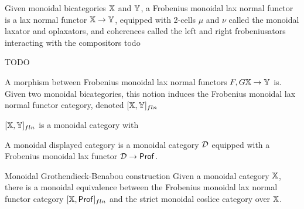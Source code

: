 \begin{definition}
Given monoidal bicategories $\mathbb{X}$ and $\mathbb{Y}$, a  Frobenius monoidal lax normal functor is a lax normal functor $\mathbb{X}\to\mathbb{Y}$, equipped with 2-cells $\mu$ and $\nu$ called the monoidal laxator and oplaxators, and coherences called the left and right frobeniusators interacting with the compositors todo 

TODO
\end{definition}



\begin{definition}
A morphism between Frobenius monoidal lax normal functors $F,G\mathbb{X}\to\mathbb{Y}$ is.  Given two monoidal bicategories, this notion induces the Frobenius monoidal lax normal functor category, denoted $[\mathbb{X},\mathbb{Y}]_{fln}$
\end{definition}

\begin{lemma}
$[\mathbb{X},\mathbb{Y}]_{fln}$ is a monoidal category with
\end{lemma}



\begin{definition}
A monoidal displayed category is a monoidal category $\mathcal{D}$ equipped with a  Frobenius monoidal lax functor $\mathcal{D}\to{\sf Prof}$.
\end{definition}

\begin{theorem}{Monoidal Grothendieck-Benabou construction}
Given a monoidal category $\mathbb{X}$, there is a monoidal equivalence between the Frobenius monoidal lax normal functor category $[\mathbb{X},{\sf Prof}]_{fln}$ and the strict monoidal coslice category over $\mathbb{X}$.
\end{theorem}







